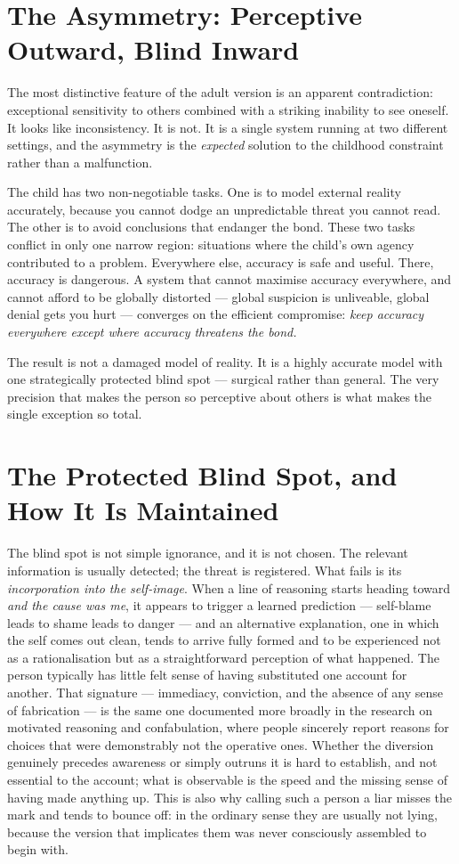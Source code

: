 \documentclass{article}
\begin{document}
\section*{The Asymmetry: Perceptive Outward, Blind Inward}

The most distinctive feature of the adult version is an apparent contradiction: exceptional sensitivity to others combined with a striking inability to see oneself. It looks like inconsistency. It is not. It is a single system running at two different settings, and the asymmetry is the \textit{expected} solution to the childhood constraint rather than a malfunction.

The child has two non-negotiable tasks. One is to model external reality accurately, because you cannot dodge an unpredictable threat you cannot read. The other is to avoid conclusions that endanger the bond. These two tasks conflict in only one narrow region: situations where the child's own agency contributed to a problem. Everywhere else, accuracy is safe and useful. There, accuracy is dangerous. A system that cannot maximise accuracy everywhere, and cannot afford to be globally distorted --- global suspicion is unliveable, global denial gets you hurt --- converges on the efficient compromise: \textit{keep accuracy everywhere except where accuracy threatens the bond.}

The result is not a damaged model of reality. It is a highly accurate model with one strategically protected blind spot --- surgical rather than general. The very precision that makes the person so perceptive about others is what makes the single exception so total.

\section*{The Protected Blind Spot, and How It Is Maintained}

The blind spot is not simple ignorance, and it is not chosen. The relevant information is usually detected; the threat is registered. What fails is its \textit{incorporation into the self-image}. When a line of reasoning starts heading toward \textit{and the cause was me}, it appears to trigger a learned prediction --- self-blame leads to shame leads to danger --- and an alternative explanation, one in which the self comes out clean, tends to arrive fully formed and to be experienced not as a rationalisation but as a straightforward perception of what happened. The person typically has little felt sense of having substituted one account for another. That signature --- immediacy, conviction, and the absence of any sense of fabrication --- is the same one documented more broadly in the research on motivated reasoning and confabulation, where people sincerely report reasons for choices that were demonstrably not the operative ones. Whether the diversion genuinely precedes awareness or simply outruns it is hard to establish, and not essential to the account; what is observable is the speed and the missing sense of having made anything up. This is also why calling such a person a liar misses the mark and tends to bounce off: in the ordinary sense they are usually not lying, because the version that implicates them was never consciously assembled to begin with.
\end{document}
